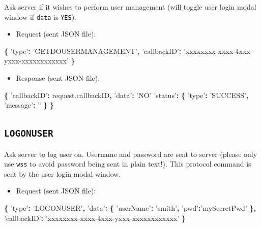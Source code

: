 \documentclass[]{book}
\newenvironment{Shaded}{\begin{snugshade}}{\end{snugshade}}
\newcommand{\AttributeTok}[1]{\textcolor[rgb]{0.77,0.63,0.00}{#1}}
\newcommand{\NormalTok}[1]{#1}
\newcommand{\OperatorTok}[1]{\textcolor[rgb]{0.81,0.36,0.00}{\textbf{#1}}}
\newcommand{\StringTok}[1]{\textcolor[rgb]{0.31,0.60,0.02}{#1}}
\newcommand{\VariableTok}[1]{\textcolor[rgb]{0.00,0.00,0.00}{#1}}
\providecommand{\tightlist}{%
  \setlength{\itemsep}{0pt}\setlength{\parskip}{0pt}}
\begin{document}
Ask server if it wishes to perform user management (will toggle user login modal window if \texttt{data} is \texttt{YES}).

\begin{itemize}
\tightlist
\item
  Request (sent JSON file):
\end{itemize}

\begin{Shaded}
\begin{Highlighting}[]
\OperatorTok{\{}
  \StringTok{'type'}\OperatorTok{:} \StringTok{'GETDOUSERMANAGEMENT'}\OperatorTok{,}
  \StringTok{'callbackID'}\OperatorTok{:} \StringTok{'xxxxxxxx-xxxx-4xxx-yxxx-xxxxxxxxxxxx'}
\OperatorTok{\}}
\end{Highlighting}
\end{Shaded}

\begin{itemize}
\tightlist
\item
  Response (sent JSON file):
\end{itemize}

\begin{Shaded}
\begin{Highlighting}[]
\OperatorTok{\{}
  \StringTok{'callbackID'}\OperatorTok{:} \VariableTok{request}\NormalTok{.}\AttributeTok{callbackID}\OperatorTok{,}
  \StringTok{'data'}\OperatorTok{:} \StringTok{'NO'}
  \StringTok{'status'}\OperatorTok{:} \OperatorTok{\{}
    \StringTok{'type'}\OperatorTok{:} \StringTok{'SUCCESS'}\OperatorTok{,}
    \StringTok{'message'}\OperatorTok{:} \StringTok{''}
  \OperatorTok{\}}
\OperatorTok{\}}
\end{Highlighting}
\end{Shaded}

\hypertarget{logonuser}{%
\subsection{\texorpdfstring{\texttt{LOGONUSER}}{LOGONUSER}}\label{logonuser}}

Ask server to log user on. Username and password are sent to server (please only use \texttt{wss} to avoid password being sent in plain text!). This protocol command is sent by the user login modal window.

\begin{itemize}
\tightlist
\item
  Request (sent JSON file):
\end{itemize}

\begin{Shaded}
\begin{Highlighting}[]
\OperatorTok{\{}
  \StringTok{'type'}\OperatorTok{:} \StringTok{'LOGONUSER'}\OperatorTok{,}
  \StringTok{'data'}\OperatorTok{:} \OperatorTok{\{}
    \StringTok{'userName'}\OperatorTok{:} \StringTok{'smith'}\OperatorTok{,}
    \StringTok{'pwd'}\OperatorTok{:}\StringTok{'mySecretPwd'}
  \OperatorTok{\},}
  \StringTok{'callbackID'}\OperatorTok{:} \StringTok{'xxxxxxxx-xxxx-4xxx-yxxx-xxxxxxxxxxxx'}
\OperatorTok{\}}
\end{Highlighting}
\end{Shaded}
\end{document}
